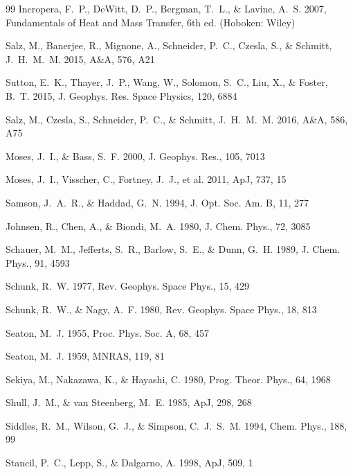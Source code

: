 \begin{thebibliography}{99}
Incropera, F.~P., DeWitt, D.~P., Bergman, T.~L., \& Lavine, A.~S. 2007,
Fundamentals of Heat and Mass Transfer, 6th ed. (Hoboken: Wiley)

Salz, M., Banerjee, R., Mignone, A., Schneider, P.~C., Czesla, S., \&
Schmitt, J.~H.~M.~M. 2015, A\&A, 576, A21

Sutton, E.~K., Thayer, J.~P., Wang, W., Solomon, S.~C., Liu, X., \& Foster,
B.~T. 2015, J. Geophys. Res. Space Physics, 120, 6884

Salz, M., Czesla, S., Schneider, P.~C., \& Schmitt, J.~H.~M.~M. 2016,
A\&A, 586, A75

Moses, J.~I., \& Bass, S.~F. 2000, J. Geophys. Res., 105, 7013

Moses, J.~I., Visscher, C., Fortney, J.~J., et al. 2011, ApJ, 737, 15

Samson, J.~A.~R., \& Haddad, G.~N. 1994, J. Opt. Soc. Am. B, 11, 277

Johnsen, R., Chen, A., \& Biondi, M.~A. 1980, J. Chem. Phys., 72, 3085

Schauer, M.~M., Jefferts, S.~R., Barlow, S.~E., \& Dunn, G.~H. 1989, J. Chem. Phys., 91, 4593

Schunk, R.~W. 1977, Rev. Geophys. Space Phys., 15, 429

Schunk, R.~W., \& Nagy, A.~F. 1980, Rev. Geophys. Space Phys., 18, 813

Seaton, M.~J. 1955, Proc. Phys. Soc. A, 68, 457

Seaton, M.~J. 1959, MNRAS, 119, 81

Sekiya, M., Nakazawa, K., \& Hayashi, C. 1980, Prog. Theor. Phys., 64, 1968

Shull, J.~M., \& van Steenberg, M.~E. 1985, ApJ, 298, 268

Siddles, R.~M., Wilson, G.~J., \& Simpson, C.~J.~S.~M. 1994, Chem. Phys., 188, 99

Stancil, P.~C., Lepp, S., \& Dalgarno, A. 1998, ApJ, 509, 1


\end{thebibliography}
